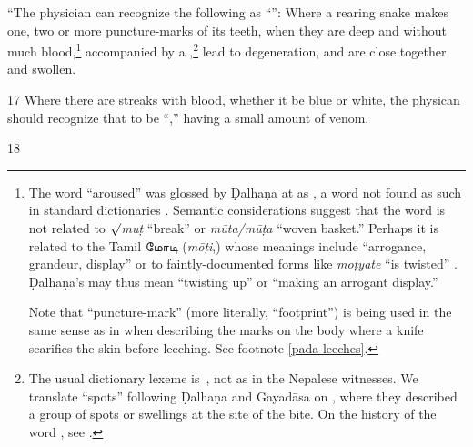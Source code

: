 \begin{translation}
“The physician can recognize the following as “”:
Where a rearing snake  makes one, two or more puncture-marks of its teeth,
when they are deep and without much blood,\footnote{\label{pada-snakes} The
    word  “aroused” was glossed by Ḍalhaṇa at  as
    , a word not found as such in standard dictionaries
    \citep{moni-sans,apte-prac,mayr-kurz,josi-maha}. Semantic considerations
    suggest that the word is not related to $\surd$\emph{muṭ} “break” or
    \emph{mūta/mūṭa} “woven basket.” Perhaps it is related to the Tamil
    \texttamil{மோடி} (\emph{mōṭi},) whose meanings include “arrogance, grandeur,
    display” \citep[\#5133]{burr-1984} or to faintly-documented forms like
    \emph{moṭyate} “is twisted” \citep[\#10186]{CDIAL}. Ḍalhaṇa's 
    may thus mean “twisting up” or “making an arrogant display.” \par Note that
     “puncture-mark” (more literally, “footprint”) is being used in
    the same sense as in  when describing the marks on the body
    where a knife scarifies the skin before leeching. See footnote
    \ref{pada-leeches}.} accompanied by a ,\footnote{The usual dictionary lexeme is \,, not 
        as in the Nepalese witnesses.  We translate “spots” following Ḍalhaṇa and
        Gayadāsa on , where they described a group of spots or
        swellings at the site of the bite. On the history of the word ,
        see \cite{kief-1996}.} lead to degeneration, and are close together and
        swollen.

\item [17]  Where there are streaks with blood, whether it be blue or white, the 
physican should recognize that to be “,” having a small amount of 
venom. 

\item [18]

    
\end{translation}